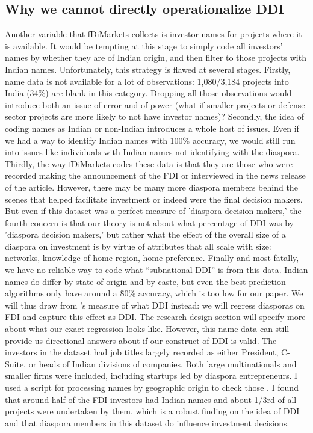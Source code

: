 \documentclass[doublespace,nopageskip]{UVAthesis}
\begin{document}
    \subsection{Why we cannot directly operationalize DDI} \label{subsection:no operationalizing DDI}
    Another variable that fDiMarkets collects is investor names for projects where it is available. It would be tempting at this stage to simply code all investors' names by whether they are of Indian origin, and then filter to those projects with Indian names. Unfortunately, this strategy is flawed at several stages.
    Firstly, name data is not available for a lot of observations: 1,080/3,184 projects into India (34\%) are blank in this category. Dropping all those observations would introduce both an issue of error and of power (what if smaller projects or defense-sector projects are more likely to not have investor names)? Secondly, the idea of coding names as Indian or non-Indian introduces a whole host of issues. Even if we had a way to identify Indian names with 100\% accuracy, we would still run into issues like individuals with Indian names not identifying with the diaspora.
    Thirdly, the way fDiMarkets codes these data is that they are those who were recorded making the announcement of the FDI or interviewed in the news release of the article. However, there may be many more diaspora members behind the scenes that helped facilitate investment or indeed were the final decision makers. But even if this dataset was a perfect measure of 'diaspora decision makers,' the fourth concern is that our theory is not about what percentage of DDI was by 'diaspora decision makers,' but rather what the effect of the overall size of a diaspora on investment is by virtue of attributes that all scale with size: networks, knowledge of home region, home preference. Finally and most fatally, we have no reliable way to code what ``subnational DDI'' is from this data. Indian names do differ by state of origin and by caste, but even the best prediction algorithms only have around a \~80\% accuracy, which is too low for our paper.\citep{dhingra_instate_2023}
    We will thus draw from \citet{leblang_familiarity_2010}'s measure of what DDI instead: we will regress diasporas on FDI and capture this effect as DDI. The research design section will specify more about what our exact regression looks like.
   However, this name data can still provide us directional answers about if our construct of DDI is valid. The investors in the dataset had job titles largely recorded as either President, C-Suite, or heads of Indian divisions of companies. Both large multinationals and smaller firms were included, including startups led by diaspora entrepreneurs. I used a script for processing names by geographic origin to check those  \citep{dhingra_instate_2023}. I found that around half of the FDI investors had Indian names and about 1/3rd of all projects were undertaken by them, which is a robust finding on the idea of DDI and that diaspora members in this dataset do influence investment decisions.
\end{document}
